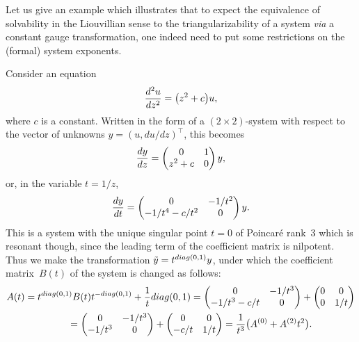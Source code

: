 \documentclass[11pt]{article}
\numberwithin{equation}{section}
\begin{document}
\begin{Example}\label{example1}Let us give an example which illustrates that to expect the equivalence of solvability in the Liouvillian sense to the triangularizability of a system {\it via} a constant gauge transformation, one indeed need to put some restrictions on the (formal) system exponents.

Consider an equation
\begin{gather*}
\frac{{\rm d}^2u}{{\rm d}z^2}=\big(z^2+c\big)u,
\end{gather*}
where $c$ is a constant. Written in the form of a $(2\times2)$-system with respect to the vector of unknowns $y=(u,du/dz)^{\top}$, this becomes
\begin{gather*}
\frac{{\rm d}y}{{\rm d}z}=\left(\begin{matrix} 0 & 1 \\
 z^2+c & 0
 \end{matrix}\right)y,
\end{gather*}
or, in the variable $t=1/z$,
\begin{gather*}
\frac{{\rm d}y}{{\rm d}t}=\left(\begin{matrix} 0 & -1/t^2 \\
 -1/t^4-c/t^2 & 0
 \end{matrix}\right)y.
\end{gather*}
This is a system with the unique singular point $t=0$ of Poincar\'e rank~$3$ which is resonant though, since the leading term of the coefficient matrix is nilpotent. Thus we make the transformation $\tilde y=t^{{\rm diag}(0,1)}y$, under which the coefficient matrix~$B(t)$ of the system is changed as follows:
\begin{gather*}
A(t)=t^{{\rm diag}(0,1)}B(t) t^{-{\rm diag}(0,1)}+\frac1t {\rm diag}(0,1)=
\left(\begin{matrix} 0 & -1/t^3 \\
-1/t^3-c/t & 0
 \end{matrix}\right)+\left(\begin{matrix} 0 & 0 \\
 0 & 1/t
\end{matrix}\right) \\
\hphantom{A(t)}{} =\left(\begin{matrix} 0 & -1/t^3 \\
 -1/t^3 & 0
\end{matrix}\right)+\left(\begin{matrix} 0 & 0 \\
-c/t & 1/t
\end{matrix}\right)=\frac1{t^3}\big(A^{(0)}+A^{(2)}t^2\big).

\end{gather*}
\end{Example}
\end{document}
